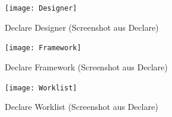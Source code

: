 \begin{figure}[H]
\begin{center}
  \texttt{[image: Designer]} %
  \caption{Declare Designer (Screenshot aus Declare)}
  \label{fig:Designer}
\end{center}
\end{figure} 


\begin{figure}[H]
\begin{center}
  \texttt{[image: Framework]} %
  \caption{Declare Framework (Screenshot aus Declare)}
  \label{fig:Framework}
\end{center}
\end{figure} 

\begin{figure}[H]
\begin{center}
  \texttt{[image: Worklist]} %
  \caption{Declare Worklist (Screenshot aus Declare)}
  \label{fig:Worklist}
\end{center}
\end{figure} 




